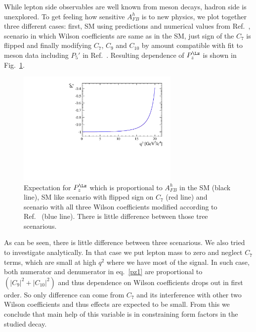 While lepton side observables are well known from meson decays, hadron side is unexplored. To get
feeling how sensitive $A_{FB}^h$ is to new physics, we plot together three different cases: first,
SM using predictions and numerical values from Ref.~\cite{Gutsche:2013pp}, scenario in which Wilson
coefficients are same as in the SM, just sign of the $C_7$ is flipped and finally modifying $C_7$,
$C_9$ and $C_{10}$ by amount compatible with fit to meson data including $P_5'$ in
Ref.~\cite{Descotes-Genon:2013wba}.
Resulting dependence of $P_z^\Lz$ is shown in Fig.~\ref{fig:PzLpred}.
%
\begin{figure}
\centering
\includegraphics[width=0.7\textwidth]{Lmumu/figs/AFBhPrediction}
\caption{Expectation for $P_z^\Lz$ which is proportional to $A_{FB}^h$ in the SM (black line), SM
like scenario with flipped sign on $C_7$ (red line) and scenario with all three Wilson coefficients
modified according to Ref.~\cite{Descotes-Genon:2013wba} (blue line). There is little difference
between those tree scenarious.}
\label{fig:PzLpred}
\end{figure}
%
As can be seen, there is little difference between three scenarious. We also tried to investigate
analytically. In that case we put lepton mass to zero and neglect $C_7$ terms, which are small at
high $q^2$ where we have most of the signal. In such case, both numerator and denumerator in
eq.~\ref{pz1} are proportional to $(|C_9|^2+|C_{10}|^2)$ and thus dependence on Wilson coefficients
drops out in first order. So only difference can come from $C_7$ and its interference with other two Wilson
coefficients and thus effects are expected to be small. From this we conclude that main help of this
variable is in constraining form factors in the studied decay. 

